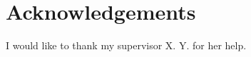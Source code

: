 \documentclass{ExcelAtFIT}
\begin{document}
\section*{Acknowledgements}
I would like to thank my supervisor X. Y. for her help.




\end{document}
